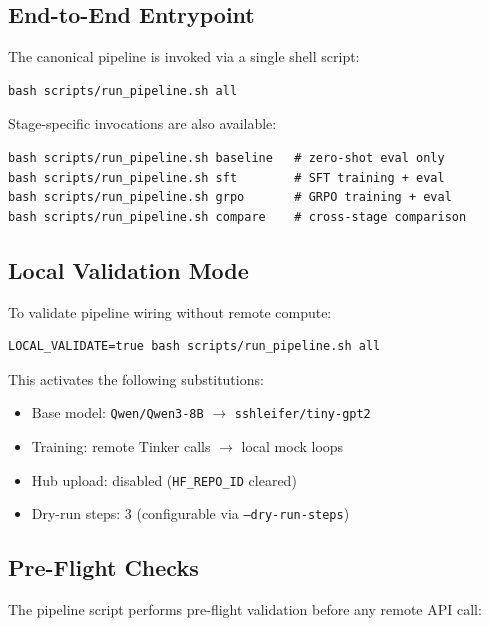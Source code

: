 \documentclass[12pt, a4paper]{article}
\begin{document}
\subsection{End-to-End Entrypoint}

The canonical pipeline is invoked via a single shell script:

\begin{lstlisting}
bash scripts/run_pipeline.sh all
\end{lstlisting}

Stage-specific invocations are also available:

\begin{lstlisting}
bash scripts/run_pipeline.sh baseline   # zero-shot eval only
bash scripts/run_pipeline.sh sft        # SFT training + eval
bash scripts/run_pipeline.sh grpo       # GRPO training + eval
bash scripts/run_pipeline.sh compare    # cross-stage comparison
\end{lstlisting}

\subsection{Local Validation Mode}

To validate pipeline wiring without remote compute:

\begin{lstlisting}
LOCAL_VALIDATE=true bash scripts/run_pipeline.sh all
\end{lstlisting}

This activates the following substitutions:
\begin{itemize}[leftmargin=1.5em, itemsep=3pt]
  \item Base model: \texttt{Qwen/Qwen3-8B} $\rightarrow$ \texttt{sshleifer/tiny-gpt2}
  \item Training: remote Tinker calls $\rightarrow$ local mock loops
  \item Hub upload: disabled (\texttt{HF\_REPO\_ID} cleared)
  \item Dry-run steps: 3 (configurable via \texttt{--dry-run-steps})
\end{itemize}

\subsection{Pre-Flight Checks}

The pipeline script performs pre-flight validation before any remote API call:
\end{document}
